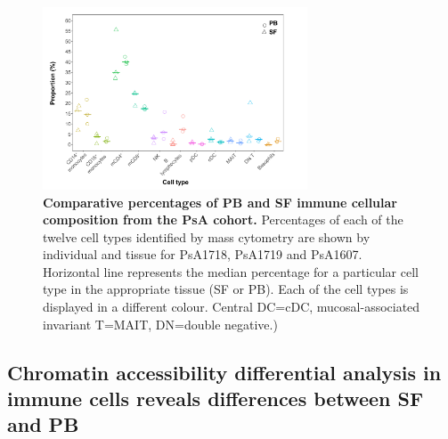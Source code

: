 \begin{figure}[H]
\centering
\includegraphics[width=0.7\textwidth]{./Results3/pdfs/PSA_ATAC_cohort_cell_type_composition_boxplots}
\caption[Comparative percentages of PB and SF immune cellular composition from the PsA cohort.]{\textbf{Comparative percentages of PB and SF immune cellular composition from the PsA cohort.} Percentages of each of the twelve cell types identified by mass cytometry are shown by individual and tissue for PsA1718, PsA1719 and PsA1607. Horizontal line represents the median percentage for a particular cell type in the appropriate tissue (SF or PB). Each of the cell types is displayed in a different colour. Central DC=cDC, mucosal-associated invariant T=MAIT, DN=double negative.)}
\label{figure:PsA_cell_composition}
\end{figure}



\subsection{Chromatin accessibility differential analysis in immune cells reveals differences between SF and PB}

